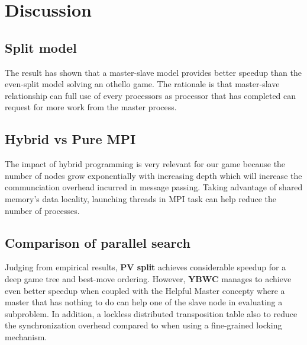 \documentclass[12pt]{article}
\begin{document}

\section{Discussion}

\subsection{Split model}

The result has shown that a master-slave model provides better speedup than the
even-split model solving an othello game. The rationale is that master-slave
relationship can full use of every processors as processor that has completed
can request for more work from the master process.

\subsection{Hybrid vs Pure MPI}

The impact of hybrid programming is very relevant for our game because the
number of nodes grow exponentially with increasing depth which will increase the
communciation overhead incurred in message passing. Taking advantage of shared
memory's data locality, launching threads in MPI task can help reduce the number
of processes.

\subsection{Comparison of parallel search}

Judging from empirical results, \textbf{PV split} achieves considerable speedup for a
deep game tree and best-move ordering. However, \textbf{YBWC} manages to achieve even
better speedup when coupled with the Helpful Master concepty where a master that
has nothing to do can help one of the slave node in evaluating a subproblem. In
addition, a lockless distributed transposition table also to reduce the
synchronization overhead compared to when using a fine-grained locking mechanism.




\end{document}
